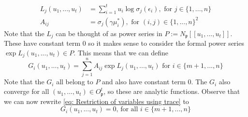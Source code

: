 \documentclass{article}
\newcommand{\mfrak}[1]{\mathfrak{#1}}
\begin{document}
\begin{align*}
    L_j(u_1, ..., u_t) &= \sum_{i = 1}^{t} u_i \log \sigma_j(\epsilon_i), \text{ for } j \in \{1, ..., n \} \\
    A_{ij} &= \sigma_j(\gamma \mu_i^*), \text{ for } (i,j) \in \{1, ..., n\}^2 
\end{align*}
Note that the $L_j$ can be thought of as power series in $P := N_\mfrak{p}[[u_1, ..., u_t]]$. These have constant term 0 so it makes sense to consider the formal power series $\exp L_j(u_1, ..., u_t) \in P$. This means that we can define
$$G_i(u_1, ..., u_t) = \sum_{j = 1}^n A_{ij} \exp L_j(u_1, ..., u_t) \text{ for } i \in \{m+1, ..., n \}$$
Note that the $G_i$ all belong to $P$ and also have constant term 0. The $G_i$ also converge for all $(u_1, ..., u_t) \in O_\mfrak p^t$, so these are analytic functions. Observe that we can now rewrite \cref{eq: Restriction of variables using trace} to
\begin{equation}\label{eq: Restriction of variables in terms of power series}
    G_i(u_1, ..., u_t) = 0 \text{, for all } i \in \{m+1, ..., n\}
\end{equation}
\end{document}
